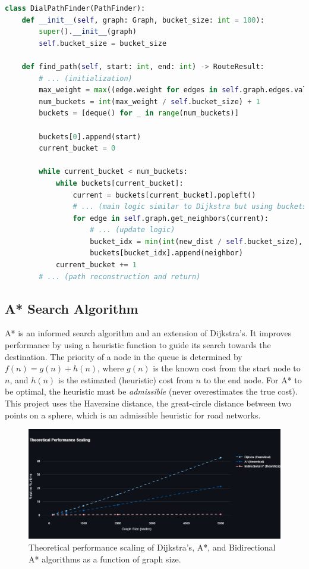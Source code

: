 \documentclass[12pt, a4paper]{report}
\begin{document}
\begin{lstlisting}[language=Python, caption={Code Snippet: `DialPathFinder' from `algorithms.py'}, label={lst:dial}]
class DialPathFinder(PathFinder):
    def __init__(self, graph: Graph, bucket_size: int = 100):
        super().__init__(graph)
        self.bucket_size = bucket_size

    def find_path(self, start: int, end: int) -> RouteResult:
        # ... (initialization)
        max_weight = max((edge.weight for edges in self.graph.edges.values() for edge in edges), default=1000)
        num_buckets = int(max_weight / self.bucket_size) + 1
        buckets = [deque() for _ in range(num_buckets)]
        
        buckets[0].append(start)
        current_bucket = 0
        
        while current_bucket < num_buckets:
            while buckets[current_bucket]:
                current = buckets[current_bucket].popleft()
                # ... (main logic similar to Dijkstra but using buckets)
                for edge in self.graph.get_neighbors(current):
                    # ... (update logic)
                    bucket_idx = min(int(new_dist / self.bucket_size), num_buckets - 1)
                    buckets[bucket_idx].append(neighbor)
            current_bucket += 1
        # ... (path reconstruction and return)
\end{lstlisting}

\subsection{A* Search Algorithm}
A* is an informed search algorithm and an extension of Dijkstra's. It improves performance by using a heuristic function to guide its search towards the destination. The priority of a node in the queue is determined by $f(n) = g(n) + h(n)$, where $g(n)$ is the known cost from the start node to $n$, and $h(n)$ is the estimated (heuristic) cost from $n$ to the end node. For A* to be optimal, the heuristic must be \textit{admissible} (never overestimates the true cost). This project uses the Haversine distance, the great-circle distance between two points on a sphere, which is an admissible heuristic for road networks.

\begin{figure}[h!]
    \centering
    \includegraphics[width=0.9\linewidth]{figures/theoretical_performance_scaling.png}
    \caption{Theoretical performance scaling of Dijkstra's, A*, and Bidirectional A* algorithms as a function of graph size.}
    \label{fig:theoretical_scaling}
\end{figure}
\end{document}

